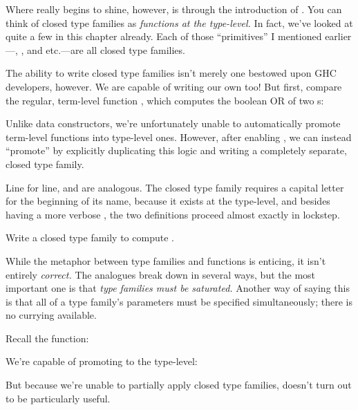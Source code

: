 \documentclass[book.tex]{subfiles}
\begin{document}
Where  really begins to shine, however, is through the
introduction of . You can think
of closed type families as \emph{functions at the type-level.} In fact, we've
looked at quite a few in this chapter already. Each of those ``primitives'' I
mentioned earlier---, , and etc.---are all closed type
families.

The ability to write closed type families isn't merely one bestowed upon GHC
developers, however. We are capable of writing our own too! But first, compare
the regular, term-level function , which computes the boolean OR of two
s:


Unlike data constructors, we're unfortunately unable to automatically promote
term-level functions into type-level ones. However, after enabling
, we can instead ``promote''  by explicitly duplicating
this logic and writing a completely separate, closed type family.


Line for line,  and  are analogous. The closed type family 
requires a capital letter for the beginning of its name, because it exists at
the type-level, and besides having a more verbose , the two
definitions proceed almost exactly in lockstep.

\begin{exercise}
Write a closed type family to compute .
\end{exercise}
\begin{solution}
\end{solution}

While the metaphor between type families and functions is enticing, it isn't
entirely \emph{correct.} The analogues break down in several ways, but the most
important one is that \emph{type families must be saturated.} Another way of
saying this is that all of a type family's parameters must be specified
simultaneously; there is no currying available.

Recall the  function:


We're capable of promoting  to the type-level:


But because we're unable to partially apply closed type families, 
doesn't turn out to be particularly useful.
\end{document}
